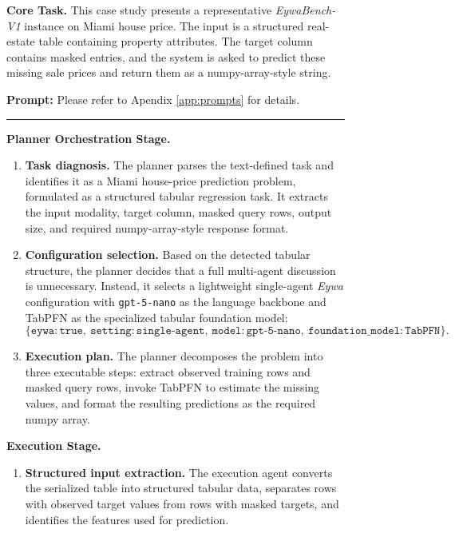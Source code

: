 \documentclass{llmxive}
\begin{document}
{\begin{figure}[!htbp]
{\begin{tcolorbox}[colback=gray!5!white, colframe=pink!90, 
title=Case Study B.1: EywaOrchestra Example 1, boxrule=0.3mm, width=1.2\textwidth, arc=2mm, auto outer arc=true]
\textbf{Core Task.}
This case study presents a representative \textit{EywaBench-V1} instance on Miami house price. The input is a structured real-estate table containing property attributes. The target column contains masked entries, and the system is asked to predict these missing sale prices and return them as a numpy-array-style string.

\vspace{3mm}

\textbf{Prompt:} Please refer to Apendix \ref{app:prompts} for details.

\vspace{3mm}
\hrule
\vspace{3mm}

\textbf{Planner Orchestration Stage.}
\begin{enumerate}
    \item \textbf{Task diagnosis.}
    The planner parses the text-defined task and identifies it as a Miami house-price prediction problem, formulated as a structured tabular regression task. It extracts the input modality, target column, masked query rows, output size, and required numpy-array-style response format.

    \item \textbf{Configuration selection.}
    Based on the detected tabular structure, the planner decides that a full multi-agent discussion is unnecessary. Instead, it selects a lightweight single-agent \textit{Eywa} configuration with \texttt{gpt-5-nano} as the language backbone and TabPFN as the specialized tabular foundation model:
    \[
    \{\texttt{eywa}: \texttt{true},\ 
    \texttt{setting}: \texttt{single-agent},\ 
    \texttt{model}: \texttt{gpt-5-nano},\ 
    \texttt{foundation\_model}: \texttt{TabPFN}\}.
    \]

    \item \textbf{Execution plan.}
    The planner decomposes the problem into three executable steps: extract observed training rows and masked query rows, invoke TabPFN to estimate the missing values, and format the resulting predictions as the required numpy array.
\end{enumerate}


\textbf{Execution Stage.}
\begin{enumerate}
    \item \textbf{Structured input extraction.}
    The execution agent converts the serialized table into structured tabular data, separates rows with observed target values from rows with masked targets, and identifies the features used for prediction.


\end{enumerate}
\end{tcolorbox}}
\end{figure}}
\end{document}
